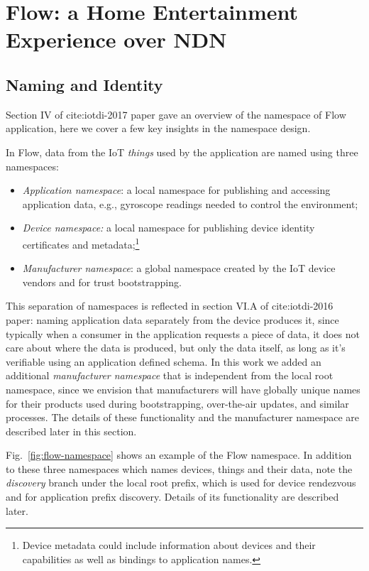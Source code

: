 \section{Flow: a Home Entertainment Experience over NDN}
\label{sec:components}

\subsection{Naming and Identity}
\label{sec:naming}

Section IV of cite:iotdi-2017 paper gave an overview of the namespace of Flow application, here we cover a few key insights in the namespace design.

In Flow, data from the IoT \textit{things} used by the application are named using three namespaces:
\begin{itemize}
\item \emph{Application namespace}: a local namespace for publishing and accessing application data, e.g., gyroscope readings needed to control the environment; 
\item \emph{Device namespace:} a local namespace for publishing device identity certificates and metadata;\footnote{Device metadata could include information about devices and their capabilities as well as bindings to application names.}
\item \emph{Manufacturer namespace}: a global namespace created by the IoT device vendors and for trust bootstrapping.
\end{itemize}

This separation of namespaces is reflected in section VI.A of cite:iotdi-2016 paper: naming application data separately from the device produces it, since typically when a consumer in the application requests a piece of data, it does not care about where the data is produced, but only the data itself, as long as it's verifiable using an application defined schema.
In this work we added an additional \textit{manufacturer namespace} that is independent from the local root namespace, since we envision that manufacturers will have globally unique names for their products used during bootstrapping, over-the-air updates, and similar processes. 
The details of these functionality and the manufacturer namespace are described later in this section.

Fig.~\ref{fig:flow-namespace} shows an example of the Flow namespace.  In addition to these three namespaces which names devices, things and their data, note the \textit{discovery} branch under the local root prefix, which is used for device rendezvous and for application prefix discovery. Details of its functionality are described later.

